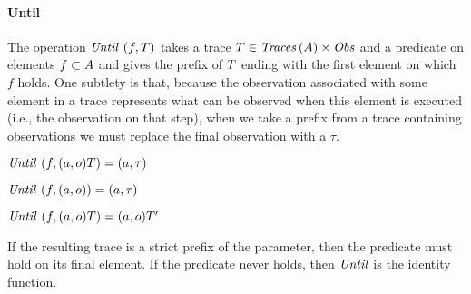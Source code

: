 \documentclass[acmsmall,review,anonymous]{acmart}\settopmatter{printfolios=true,printccs=false,printacmref=false}
\begin{document}
{\paragraph*{Until}
The operation \(\mathit{Until}~(f,T)\)
takes a trace
\(T \in \mathit{Traces}\,(A) \times \mathit{Obs}\) and a predicate
on elements \(f \subset A\) and gives the prefix of
\(T\) ending with the first element on which \(f\) holds.
One subtlety is that, because the observation associated with some element
in a trace
represents what can be observed when this element is executed (i.e., the
observation on that step), when we take a prefix from a trace containing
observations
we must replace the final observation with a \(\tau\).

  \begin{center}
  \begin{minipage}{.3\textwidth}
             {\(\mathit{Until}~(f,(a,o)T) = (a,\tau)\)}
  \end{minipage}
%
  \begin{minipage}{.3\textwidth}
  \judgment{}
           {\(\mathit{Until}~(f,(a,o)) = (a,\tau)\)}
%
  \end{minipage}
  \begin{minipage}{.3\textwidth}
              {\(\mathit{Until}~(f,(a,o)T) = (a,o)T'\)}
  \end{minipage}
  \end{center}
%
If the resulting trace is a strict prefix of the parameter, then the
predicate must hold on its final element. If the predicate never holds, then
\(\mathit{Until}\) is the identity function.



}
\end{document}
